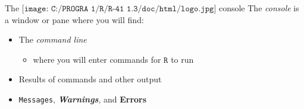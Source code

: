 \documentclass[
  ignorenonframetext,
]{beamer}
\newcommand{\ErrorTok}[1]{\textcolor[rgb]{0.64,0.00,0.00}{\textbf{#1}}}
\newcommand{\WarningTok}[1]{\textcolor[rgb]{0.56,0.35,0.01}{\textbf{\textit{#1}}}}
\providecommand{\tightlist}{%
  \setlength{\itemsep}{0pt}\setlength{\parskip}{0pt}}
\begin{document}
\begin{frame}[fragile]{The
\(\texttt{[image: C:/PROGRA~1/R/R-41~1.3/doc/html/logo.jpg]}\)
console}
\protect\hypertarget{the-includegraphicsheight1emcprogra1rr-411.3dochtmllogo.jpg-console}{}
The \emph{console} is a window or pane where you will find:

\begin{itemize}
\item
  The \emph{command line}

  \begin{itemize}
  \tightlist
  \item
    where you will enter commands for \(\texttt{R}\) to run
  \end{itemize}
\item
  Results of commands and other output
\item
  \texttt{Messages}, \WarningTok{Warnings}, and \ErrorTok{Errors}
\end{itemize}
\end{frame}
\end{document}

